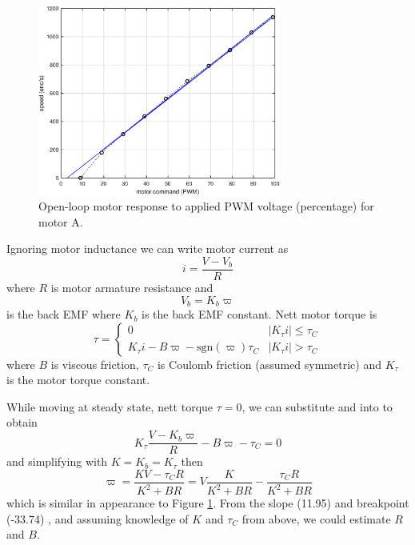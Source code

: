 \documentclass[11pt,fleqn]{article}
\begin{document}
\begin{figure}
\centering
\includegraphics[width=8cm]{motor.eps}
\caption{Open-loop motor response to applied PWM voltage (percentage) for motor A.}
\label{fig:motor-response}
\end{figure}

Ignoring motor inductance  we can write motor current as
\begin{equation}
i = \frac{V - V_b}{R} \label{eq:current}
\end{equation}
where $R$ is motor armature resistance and
\begin{equation}
V_b = K_b \varpi \label{eq:bemf}
\end{equation}
is the back EMF where $K_b$ is the back EMF constant.
Nett motor torque is
\begin{equation}
\tau = \left\{ \begin{array}{ll} 0 & |K_\tau i| \le \tau_C \\ K_\tau i - B\varpi - \mathrm{sgn}(\varpi )\tau_C & |K_\tau i| > \tau_C \end{array} \right. \label{eq:torque}
\end{equation}
where $B$ is viscous friction, $\tau_C$ is Coulomb friction (assumed symmetric) and $K_\tau$ is the motor torque constant.

While moving at steady state, nett torque $\tau = 0$, we can substitute  and  into  to obtain
\begin{equation*}
K_\tau \frac{V - K_b \varpi}{R} - B\varpi - \tau_C = 0
\end{equation*}
and simplifying with $K = K_b = K_\tau$ then
\begin{equation}
\varpi = \frac{K V - \tau_C R}{K^2 + BR} = V \frac{K}{K^2 + BR} -   \frac{\tau_C R}{K^2 + BR}
\end{equation}
which is similar in appearance to Figure \ref{fig:motor-response}.  From the slope (11.95) and breakpoint (-33.74) , and assuming knowledge of $K$ and $\tau_C$ from above, we could estimate $R$ and $B$.
\end{document}
